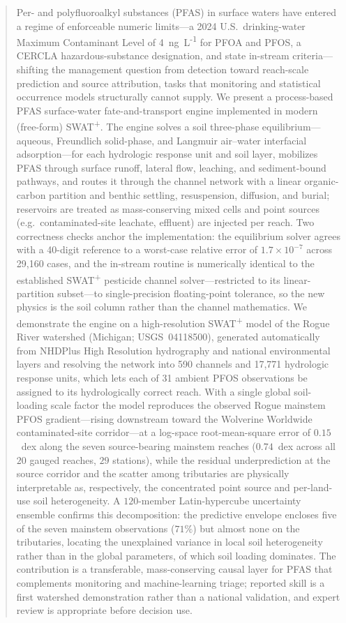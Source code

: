 \begin{abstract}
\noindent Per- and polyfluoroalkyl substances (PFAS) in surface waters have entered a regime of enforceable numeric limits---a 2024 U.S.\ drinking-water Maximum Contaminant Level of 4~ng~L\textsuperscript{-1} for PFOA and PFOS, a CERCLA hazardous-substance designation, and state in-stream criteria---shifting the management question from detection toward reach-scale prediction and source attribution, tasks that monitoring and statistical occurrence models structurally cannot supply. We present a process-based PFAS surface-water fate-and-transport engine implemented in modern (free-form) SWAT\textsuperscript{+}. The engine solves a soil three-phase equilibrium---aqueous, Freundlich solid-phase, and Langmuir air--water interfacial adsorption---for each hydrologic response unit and soil layer, mobilizes PFAS through surface runoff, lateral flow, leaching, and sediment-bound pathways, and routes it through the channel network with a linear organic-carbon partition and benthic settling, resuspension, diffusion, and burial; reservoirs are treated as mass-conserving mixed cells and point sources (e.g.\ contaminated-site leachate, effluent) are injected per reach. Two correctness checks anchor the implementation: the equilibrium solver agrees with a 40-digit reference to a worst-case relative error of $1.7\times10^{-7}$ across 29{,}160 cases, and the in-stream routine is numerically identical to the established SWAT\textsuperscript{+} pesticide channel solver---restricted to its linear-partition subset---to single-precision floating-point tolerance, so the new physics is the soil column rather than the channel mathematics. We demonstrate the engine on a high-resolution SWAT\textsuperscript{+} model of the Rogue River watershed (Michigan; USGS~04118500), generated automatically from NHDPlus High Resolution hydrography and national environmental layers and resolving the network into 590 channels and 17{,}771 hydrologic response units, which lets each of 31 ambient PFOS observations be assigned to its hydrologically correct reach. With a single global soil-loading scale factor the model reproduces the observed Rogue mainstem PFOS gradient---rising downstream toward the Wolverine Worldwide contaminated-site corridor---at a log-space root-mean-square error of $0.15$~dex along the seven source-bearing mainstem reaches ($0.74$~dex across all $20$ gauged reaches, $29$ stations), while the residual underprediction at the source corridor and the scatter among tributaries are physically interpretable as, respectively, the concentrated point source and per-land-use soil heterogeneity. A $120$-member Latin-hypercube uncertainty ensemble confirms this decomposition: the predictive envelope encloses five of the seven mainstem observations ($71\%$) but almost none on the tributaries, locating the unexplained variance in local soil heterogeneity rather than in the global parameters, of which soil loading dominates. The contribution is a transferable, mass-conserving causal layer for PFAS that complements monitoring and machine-learning triage; reported skill is a first watershed demonstration rather than a national validation, and expert review is appropriate before decision use.
\end{abstract}

